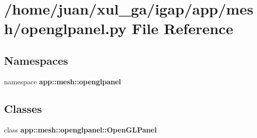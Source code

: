 \section{/home/juan/xul\_\-ga/igap/app/mesh/openglpanel.py File Reference}
\label{mesh_2openglpanel_8py}
\subsection*{Namespaces}
\begin{CompactItemize}
\item 
namespace {\bf app::mesh::openglpanel}
\end{CompactItemize}
\subsection*{Classes}
\begin{CompactItemize}
\item 
class {\bf app::mesh::openglpanel::OpenGLPanel}
\end{CompactItemize}
